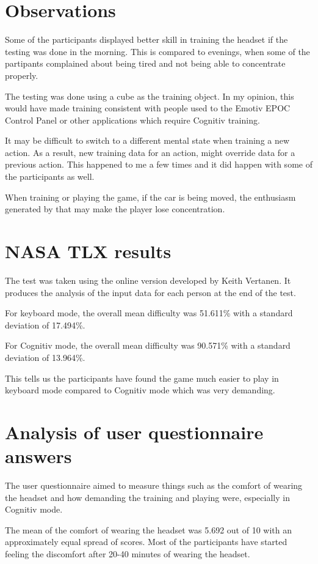 \section{Observations}

Some of the participants displayed better skill in training the headset if the testing was done in the morning. This is compared to evenings, when some of the partipants complained about being tired and not being able to concentrate properly.

The testing was done using a cube as the training object. In my opinion, this would have made training consistent with people used to the Emotiv EPOC Control Panel or other applications which require Cognitiv training. 

It may be difficult to switch to a different mental state when training a new action. As a result, new training data for an action, might override data for a previous action. This happened to me a few times and it did happen with some of the participants as well.

When training or playing the game, if the car is being moved, the enthusiasm generated by that may make the player lose concentration.

\section{NASA TLX results}
The test was taken using the \cite{nasatlx} online version developed by Keith Vertanen. It produces the analysis of the input data for each person at the end of the test. 

For keyboard mode, the overall mean difficulty was 51.611\% with a standard deviation of 17.494\%.

For Cognitiv mode, the overall mean difficulty was 90.571\% with a standard deviation of 13.964\%.

This tells us the participants have found the game much easier to play in keyboard mode compared to Cognitiv mode which was very demanding.

\section{Analysis of user questionnaire answers}
The user questionnaire aimed to measure things such as the comfort of wearing the headset and how demanding the training and playing were, especially in Cognitiv mode.

The mean of the comfort of wearing the headset was 5.692 out of 10 with an approximately equal spread of scores. Most of the participants have started feeling the discomfort after 20-40 minutes of wearing the headset. 


